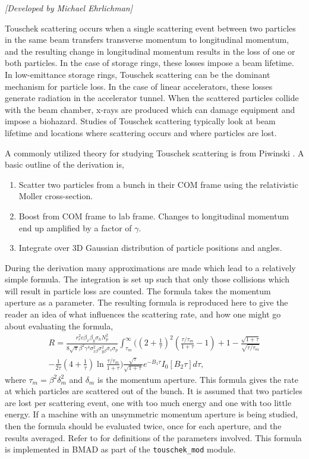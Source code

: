 \textit{[Developed by Michael Ehrlichman]}

Touschek scattering occurs when a single
scattering event between two particles in the same beam transfers
transverse momentum to longitudinal momentum, and the resulting change
in longitudinal momentum results in the loss of one or both particles.
In the case of storage rings, these losses impose a beam lifetime.  In
low-emittance storage rings, Touschek scattering can be the dominant
mechanism for particle loss.  In the case of linear accelerators,
these losses generate radiation in the accelerator tunnel.  When the
scattered particles collide with the beam chamber, x-rays are produced
which can damage equipment and impose a biohazard.  Studies of
Touschek scattering typically look at beam lifetime and locations
where scattering occurs and where particles are lost.

A commonly utilized theory for studying Touschek scattering is from
Piwinski \cite{b:piwinski}.  A basic outline of the derivation is,
\begin{enumerate}
\item Scatter two particles from a bunch in their COM frame using the relativistic
Moller cross-section.
\item Boost from COM frame to lab frame.  Changes to longitudinal momentum end up 
amplified by a factor of $\gamma$.
\item Integrate over 3D Gaussian distribution of particle positions and angles.
\end{enumerate}
During the derivation many approximations are made which lead to a relatively simple
formula.  The integration is set up such that only those collisions which will
result in particle loss are counted.  The formula takes the momentum aperture
as a parameter.  The resulting formula is reproduced here to give the reader
an idea of what influences the scattering rate, and how one might go about evaluating
the formula,
\begin{multline}
R=\frac{r_e^2 c\beta_x\beta_y\sigma_h N_p^2}{8\sqrt\pi\beta^2\gamma^4\sigma_{x\beta}^2
\sigma_{y\beta}^2\sigma_s\sigma_p}\int_{\tau_m}^\infty\Bigg(
\left(2+\frac{1}{\tau}\right)^2\left(\frac{\tau/\tau_m}{1+\tau}-1\right)+1
-\frac{\sqrt{1+\tau}}{\sqrt{\tau/\tau_m}}\\
-\frac{1}{2\tau}\left(4+\frac{1}{\tau}\right)\ln\frac{\tau/\tau_m}{1+\tau}\Bigg)
\frac{\sqrt\tau}{\sqrt{1+\tau}}e^{-B_1\tau}I_0\left[B_2\tau\right]d\tau,
\end{multline}
where $\tau_m=\beta^2\delta_m^2$ and $\delta_m$ is the momentum
aperture.  This formula gives the rate at which particles are
scattered out of the bunch.  It is assumed that two particles are lost
per scattering event, one with too much energy and one with too little
energy.  If a machine with an unsymmetric momentum aperture is being
studied, then the formula should be evaluated twice, once for each
aperture, and the results averaged.  Refer to \cite{b:piwinski} for
definitions of the parameters involved.  This formula is implemented
in BMAD as part of the {\tt touschek\_mod} module.

